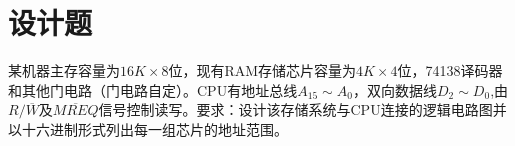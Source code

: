 \documentclass[a4paper]{exam}
\begin{document}
\section{设计题}
\begin{questions}
	\question 某机器主存容量为$16K \times 8$位，现有RAM存储芯片容量为$4K \times 4$位，74138译码器和其他门电路（门电路自定）。CPU有地址总线${A_{15}} \sim {A_0}$，双向数据线$D_2 \sim D_0$,由$R/\overline W$及$\overline {MREQ}$信号控制读写。要求：设计该存储系统与CPU连接的逻辑电路图并以十六进制形式列出每一组芯片的地址范围。
	\vspace{4cm}
\end{questions}
\end{document}
